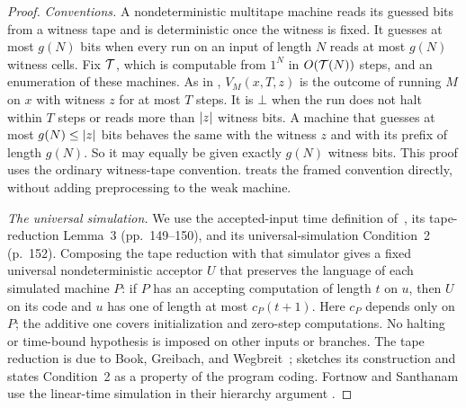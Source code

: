 \begin{proof}
\emph{Conventions.} A nondeterministic multitape machine reads its
guessed bits from a witness tape and is deterministic once the witness
is fixed. It guesses at most \(g(N)\) bits when every run on an input of
length \(N\) reads at most \(g(N)\) witness cells. Fix \(\mathcal T\), which is
computable from \(1^N\) in \(O(\mathcal T(N))\) steps, and an enumeration of
these machines. As in \cite[Section~4.1]{CLW20}, \(V_M(x,T,z)\) is the
outcome of running \(M\) on \(x\) with witness \(z\) for at most \(T\)
steps. It is \(\bot\) when the run does not halt within \(T\) steps or
reads more than \(\left|z\right|\) witness bits. A machine that guesses at most
\(g(N)\le\left|z\right|\) bits behaves the same with the witness \(z\) and with
its prefix of length \(g(N)\). So it may equally be given exactly
\(g(N)\) witness bits. This proof uses the ordinary witness-tape
convention.  treats the framed convention
directly, without adding preprocessing to the weak machine.

\emph{The universal simulation.} We use the accepted-input time
definition of~\cite[p.~147]{SFM78}, its tape-reduction Lemma~3
(pp.~149--150), and its universal-simulation Condition~2 (p.~152).
Composing the tape reduction with that simulator gives a fixed
universal nondeterministic acceptor \(U\) that preserves the language
of each simulated machine \(P\): if \(P\)
has an accepting computation of length \(t\) on \(u\), then \(U\)
on its code and \(u\) has one of length at most \(c_P(t+1)\).
Here \(c_P\) depends only on \(P\); the additive one covers
initialization and zero-step computations. No halting or time-bound
hypothesis is imposed on other inputs or branches. The tape reduction
is due to Book, Greibach, and Wegbreit~\cite{BGW70};
\cite{SFM78} sketches its construction and states Condition~2 as a
property of the program coding. Fortnow and Santhanam use the
linear-time simulation in their hierarchy argument
\cite[proof of Theorem~7.1]{FS16}.


\end{proof}
